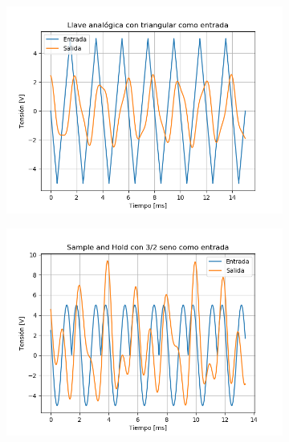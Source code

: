 \begin{figure}[H]
	\begin{subfigure}{.5\textwidth}
	\centering
	\includegraphics[width=\textwidth]{ImagenesEjercicio6/puntob1/LA - Tri.png}
	\end{subfigure}
	\begin{subfigure}{.5\textwidth}
	\centering
	\includegraphics[width=\textwidth]{ImagenesEjercicio6/puntob1/SH - 3 2.png}
	\end{subfigure}
	

\end{figure}
